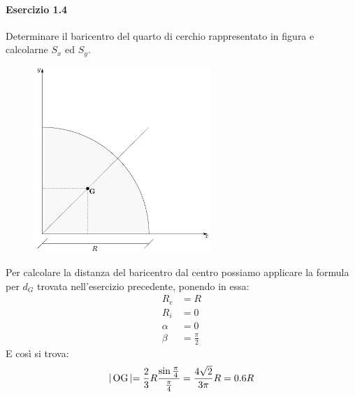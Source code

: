 \paragraph{Esercizio 1.4}
Determinare il baricentro del quarto di cerchio rappresentato in figura e calcolarne $S_x$ ed $S_y$.
\renewcommand{\thefigure}{1.4~-~1}
\begin{figure}[ht]
\centering
\includegraphics[width=0.6\textwidth]{Immagini/Parte_1/Esercizio1_4/Esercizio1_4.pdf}
\caption{}
\label{Esercizio1_4}
\end{figure}
Per calcolare la distanza del baricentro dal centro possiamo applicare la formula per $d_G$ trovata nell'esercizio precedente, ponendo in essa: 
\begin{align*}
R_e &= R \\ 
R_i &= 0 \\
\alpha &= 0 \\ 
\beta &=\frac{\pi}{2}
\end{align*}
E così si trova: 
\begin{equation*}
\lvert \, \textup{OG} \, \lvert = \frac{2}{3}R\frac{\sin\frac{\pi}{4}}{\frac{\pi}{4}} = \frac{4\sqrt{2}}{3\pi}R = 0.6R 
\end{equation*}
